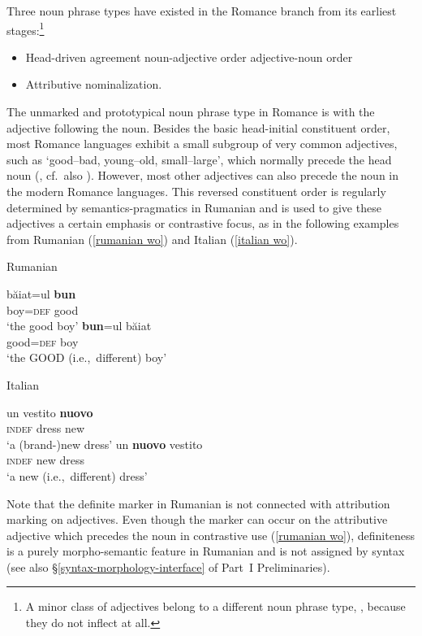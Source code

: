 Three noun phrase types have existed in the Romance branch from its earliest stages:\footnote{A minor class of adjectives belong to a different noun phrase type, 
, because they do not inflect at all.}
\begin{itemize}
\item Head\hyp{}driven agreement
	\subitem noun-adjective order
	\subitem adjective-noun order
\item Attributive nominalization.
\end{itemize}
The unmarked and prototypical noun phrase type in Romance is  with the adjective following the noun. Besides the basic head-initial constituent order, most Romance languages exhibit a small subgroup of very common adjectives, such as ‘good–bad, young–old, small–large’, which normally precede the head noun (\citealt[146–147]{posner1996}, cf.~also \citealt[340]{silvestri1998}). However, most other adjectives can also precede the noun in the modern Romance languages. This reversed constituent order is regularly determined by semantics-pragmatics in Rumanian and is used to give these adjectives a certain emphasis or contrastive focus, as in the following examples from Rumanian (\ref{rumanian wo}) and Italian (\ref{italian wo}).
\begin{exe}
\ex
\begin{xlist} 
\label{rumanian wo} 
\ex \rm{Rumanian \citep{beyer-etal1987}}\\
\begin{xlist}
\ex	
\gll	băiat=ul \textbf{bun}\\
	boy=\textsc{def} good\\
\glt	‘the good boy’
\ex	
\gll	\textbf{bun}=ul băiat\\
	good=\textsc{def} boy\\
\glt	‘the GOOD (i.e.,~different) boy’ 
\end{xlist}
\label{italian wo}
\ex \rm{Italian \citep[146]{posner1996}}
\begin{xlist}
\ex	
\gll	un vestito \textbf{nuovo}\\
	\textsc{indef} dress new\\
\glt	‘a (brand-)new dress’
\ex	
\gll	un \textbf{nuovo} vestito\\
	\textsc{indef} new dress\\
\glt	‘a new (i.e.,~different) dress’
\end{xlist}
\end{xlist}
\end{exe}
Note that the definite marker in Rumanian is not connected with attribution marking on adjectives. Even though the marker can occur on the attributive adjective which precedes the noun in contrastive use (\ref{rumanian wo}), definiteness is a purely morpho-semantic feature in Rumanian and is not assigned by syntax (see also \S\ref{syntax-morphology-interface} of Part~I Preliminaries).

